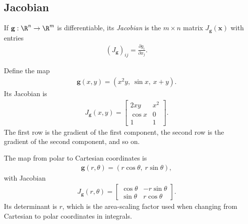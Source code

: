 \documentclass[a4paper, 12pt]{book}
\begin{document}
\subsection{Jacobian}

If $\mathbf{g} : \R^n \to \R^m$ is differentiable, its \emph{Jacobian} is the $m \times n$ matrix $J_{\mathbf{g}}(\mathbf{x})$ with entries
\begin{align}
    (J_{\mathbf{g}})_{ij} = \frac{\partial g_i}{\partial x_j}.
\end{align}
\begin{example}
    Define the map
    \begin{align}
        \mathbf{g}(x,y) = (x^2y,\ \sin x,\ x+y).
    \end{align}
    Its Jacobian is
    \begin{align}
        J_{\mathbf{g}}(x,y) =
        \begin{bmatrix}
            2xy & x^2\\
            \cos x & 0\\
            1 & 1
        \end{bmatrix}.
    \end{align}
    The first row is the gradient of the first component, the second row is the
    gradient of the second component, and so on.
\end{example}

\begin{example}
    The map from polar to Cartesian coordinates is
    \begin{align}
        \mathbf{g}(r,\theta) = (r\cos\theta,\ r\sin\theta),
    \end{align}
    with Jacobian
    \begin{align}
        J_{\mathbf{g}}(r,\theta) =
        \begin{bmatrix}
            \cos\theta & -r\sin\theta\\
            \sin\theta & r\cos\theta
        \end{bmatrix}.
    \end{align}
    Its determinant is $r$, which is the area-scaling factor used when changing from
    Cartesian to polar coordinates in integrals.
\end{example}
\end{document}
